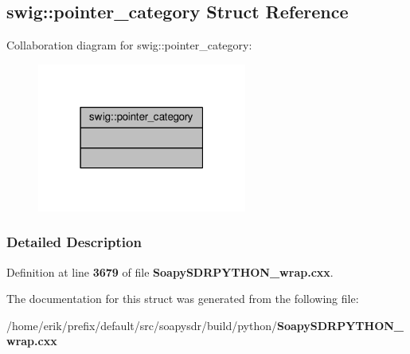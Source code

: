 \subsection{swig\+:\+:pointer\+\_\+category Struct Reference}
\label{structswig_1_1pointer__category}


Collaboration diagram for swig\+:\+:pointer\+\_\+category\+:
\nopagebreak
\begin{figure}[H]
\begin{center}
\leavevmode
\includegraphics[width=195pt]{d1/d14/structswig_1_1pointer__category__coll__graph}
\end{center}
\end{figure}


\subsubsection{Detailed Description}


Definition at line {\bf 3679} of file {\bf Soapy\+S\+D\+R\+P\+Y\+T\+H\+O\+N\+\_\+wrap.\+cxx}.



The documentation for this struct was generated from the following file\+:\begin{DoxyCompactItemize}
\item 
/home/erik/prefix/default/src/soapysdr/build/python/{\bf Soapy\+S\+D\+R\+P\+Y\+T\+H\+O\+N\+\_\+wrap.\+cxx}\end{DoxyCompactItemize}
